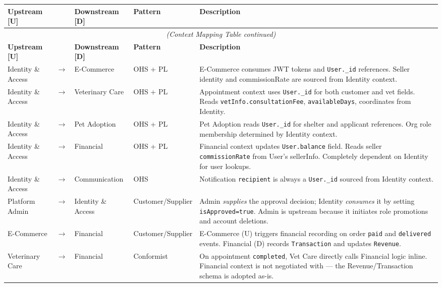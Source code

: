 \documentclass[12pt,a4paper]{article}
\begin{document}
\begin{longtable}{@{}p{3.2cm}p{0.5cm}p{3.2cm}p{2.2cm}p{5.2cm}@{}}
\toprule
\textbf{Upstream [U]} & & \textbf{Downstream [D]} & \textbf{Pattern} & \textbf{Description} \\
\midrule
\endfirsthead
\multicolumn{5}{c}{\textit{(Context Mapping Table continued)}} \\
\toprule
\textbf{Upstream [U]} & & \textbf{Downstream [D]} & \textbf{Pattern} & \textbf{Description} \\
\midrule
\endhead
\bottomrule
\endfoot
Identity \& Access & $\rightarrow$ & E-Commerce & OHS + PL & E-Commerce consumes JWT tokens and \texttt{User.\_id} references. Seller identity and commissionRate are sourced from Identity context. \\[4pt]
Identity \& Access & $\rightarrow$ & Veterinary Care & OHS + PL & Appointment context uses \texttt{User.\_id} for both customer and vet fields. Reads \texttt{vetInfo.consultationFee}, \texttt{availableDays}, coordinates from Identity. \\[4pt]
Identity \& Access & $\rightarrow$ & Pet Adoption & OHS + PL & Pet Adoption reads \texttt{User.\_id} for shelter and applicant references. Org role membership determined by Identity context. \\[4pt]
Identity \& Access & $\rightarrow$ & Financial & OHS + PL & Financial context updates \texttt{User.balance} field. Reads seller \texttt{commissionRate} from User's sellerInfo. Completely dependent on Identity for user lookups. \\[4pt]
Identity \& Access & $\rightarrow$ & Communication & OHS & Notification \texttt{recipient} is always a \texttt{User.\_id} sourced from Identity context. \\[4pt]
Platform Admin & $\rightarrow$ & Identity \& Access & Customer/Supplier & Admin \textit{supplies} the approval decision; Identity \textit{consumes} it by setting \texttt{isApproved=true}. Admin is upstream because it initiates role promotions and account deletions. \\[4pt]
E-Commerce & $\rightarrow$ & Financial & Customer/Supplier & E-Commerce (U) triggers financial recording on order \texttt{paid} and \texttt{delivered} events. Financial (D) records \texttt{Transaction} and updates \texttt{Revenue}. \\[4pt]
Veterinary Care & $\rightarrow$ & Financial & Conformist & On appointment \texttt{completed}, Vet Care directly calls Financial logic inline. Financial context is not negotiated with — the Revenue/Transaction schema is adopted as-is. \\[4pt]

\end{longtable}
\end{document}
